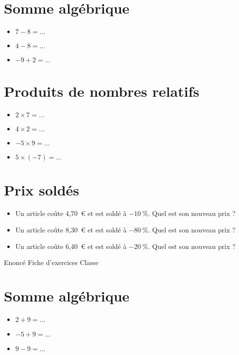 \documentclass[a4paper,11pt,fleqn]{article}		%
\begin{document}
\section{Somme algébrique}
\begin{itemize}

  \item $7 -8=\ldots$
  \item $4 -8=\ldots$
  \item $-9 +2=\ldots$
\end{itemize}


\section{Produits de nombres relatifs}
\begin{itemize}

  \item $2\times7=\ldots$
  \item $4\times2=\ldots$
  \item $-5\times9=\ldots$
  \item $5\times(-7)=\ldots$
\end{itemize}


\section{Prix soldés}
\begin{itemize}

  \item Un article coûte 4,70~€ et est soldé à $-10~\%$. Quel est son nouveau prix ?
  \item Un article coûte 8,30~€ et est soldé à $-80~\%$. Quel est son nouveau prix ?
  \item Un article coûte 6,40~€ et est soldé à $-20~\%$. Quel est son nouveau prix ?
\end{itemize}
\newpage
\setcounter{exo}{0}
\setcounter{section}{0}
{Enoncé} \hfill {\huge Fiche d'exercices } \hfill {Classe}

\section{Somme algébrique}
\begin{itemize}

  \item $2 +9=\ldots$
  \item $-5 +9=\ldots$
  \item $9 -9=\ldots$
\end{itemize}
\end{document}
